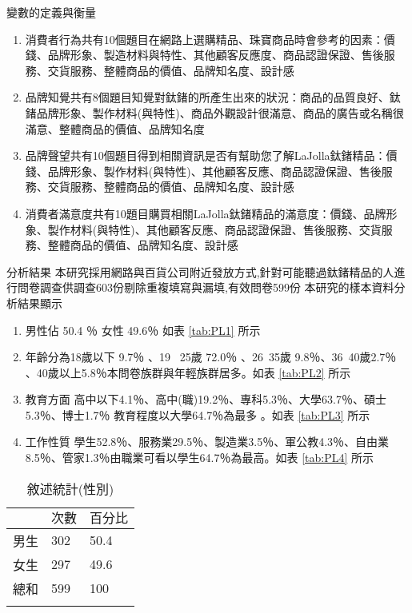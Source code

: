 變數的定義與衡量
\begin{enumerate}
\item  消費者行為共有10個題目在網路上選購精品、珠寶商品時會參考的因素：價錢、品牌形象、製造材料與特性、其他顧客反應度、商品認證保證、售後服務、交貨服務、整體商品的價值、品牌知名度、設計感
\item 品牌知覺共有8個題目知覺對鈦鍺的所產生出來的狀況：商品的品質良好、鈦鍺品牌形象、製作材料(與特性)、商品外觀設計很滿意、商品的廣告或名稱很滿意、整體商品的價值、品牌知名度
\item 品牌聲望共有10個題目得到相關資訊是否有幫助您了解LaJolla鈦鍺精品：價錢、品牌形象、製作材料(與特性)、其他顧客反應、商品認證保證、售後服務、交貨服務、整體商品的價值、品牌知名度、設計感
\item 消費者滿意度共有10題目購買相關LaJolla鈦鍺精品的滿意度：價錢、品牌形象、製作材料(與特性)、其他顧客反應、商品認證保證、售後服務、交貨服務、整體商品的價值、品牌知名度、設計感
\end{enumerate}
分析結果
本研究採用網路與百貨公司附近發放方式,針對可能聽過鈦鍺精品的人進行問卷調查供調查603份剔除重複填寫與漏填,有效問卷599份 
本研究的樣本資料分析結果顯示 
\begin{enumerate}
\item 男性佔 50.4 ％ 女性 49.6％ 如表 \ref{tab:PL1} 所示 
\item 年齡分為18歲以下 9.7％ 、19 ~25歲 72.0％ 、26~35歲 9.8％、36~40歲2.7％ 、40歲以上5.8％本問卷族群與年輕族群居多。如表  \ref{tab:PL2} 所示
\item 教育方面 高中以下4.1％、高中(職)19.2％、專科5.3％、大學63.7％、碩士5.3％、博士1.7％ 教育程度以大學64.7％為最多 。如表 \ref{tab:PL3} 所示
\item 工作性質 學生52.8％、服務業29.5％、製造業3.5％、軍公教4.3％、自由業8.5％、管家1.3％由職業可看以學生64.7％為最高。如表 \ref{tab:PL4} 所示
\end{enumerate}

\begin{table}[htb]
\caption{敘述統計(性別)}
\label{tab:PL1}
\renewcommand{\arraystretch}{1.2} %
\arrayrulewidth=1pt               %
\tabcolsep=60pt                   %
%
\begin{tabular}[t]{lll}  %
\hline
 & $次數$ & $百分比$ \\
\hline
男生        & 302 & 50.4 \\
女生        & 297  & 49.6 \\
總和        & 599  & 100 \\
\hline
\centering
\label{fig:PL4}
\end{tabular}
\end{table}

